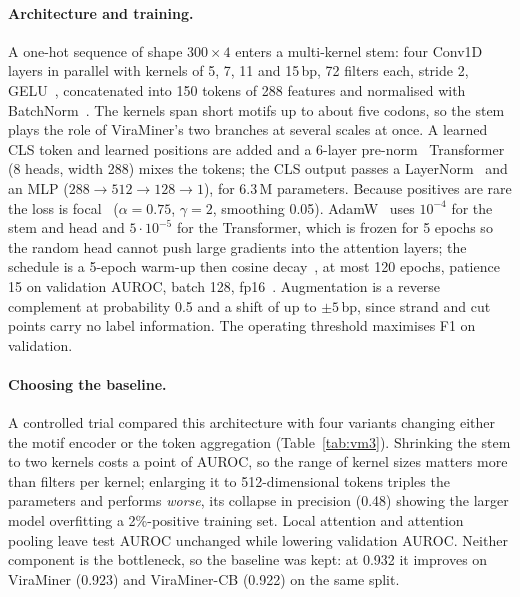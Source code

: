 \documentclass[10pt,twocolumn,a4paper]{article}
\begin{document}
\paragraph{Architecture and training.}
A one-hot sequence of shape $300\times4$ enters a multi-kernel stem: four Conv1D
layers in parallel with kernels of 5, 7, 11 and 15\,bp, 72 filters each, stride
2, GELU~\cite{hendrycks2016gelu}, concatenated into 150 tokens of 288 features
and normalised with BatchNorm~\cite{ioffe2015batchnorm}. The kernels span short
motifs up to about five codons, so the stem plays the role of ViraMiner's two
branches at several scales at once. A learned CLS token and learned positions are
added and a 6-layer pre-norm~\cite{xiong2020prenorm} Transformer (8 heads, width
288) mixes the tokens; the CLS output passes a LayerNorm~\cite{ba2016layernorm}
and an MLP ($288\to512\to128\to1$), for 6.3\,M parameters. Because positives are
rare the loss is focal~\cite{lin2017focal} ($\alpha=0.75$, $\gamma=2$, smoothing
0.05). AdamW~\cite{loshchilov2019adamw} uses $10^{-4}$ for the stem and head and
$5\cdot10^{-5}$ for the Transformer, which is frozen for 5 epochs so the random
head cannot push large gradients into the attention layers; the schedule is a
5-epoch warm-up then cosine decay~\cite{loshchilov2017sgdr}, at most 120 epochs,
patience 15 on validation AUROC, batch 128, fp16~\cite{micikevicius2018mixed}.
Augmentation is a reverse complement at probability 0.5 and a shift of up to
$\pm5$\,bp, since strand and cut points carry no label information. The operating
threshold maximises F1 on validation.

\paragraph{Choosing the baseline.}
A controlled trial compared this architecture with four variants changing either
the motif encoder or the token aggregation (Table~\ref{tab:vm3}). Shrinking the
stem to two kernels costs a point of AUROC, so the range of kernel sizes matters
more than filters per kernel; enlarging it to 512-dimensional tokens triples the
parameters and performs \emph{worse}, its collapse in precision (0.48) showing
the larger model overfitting a 2\%-positive training set. Local attention and
attention pooling leave test AUROC unchanged while lowering validation AUROC.
Neither component is the bottleneck, so the baseline was kept: at 0.932 it
improves on ViraMiner (0.923) and ViraMiner-CB (0.922) on the same split.
\end{document}
